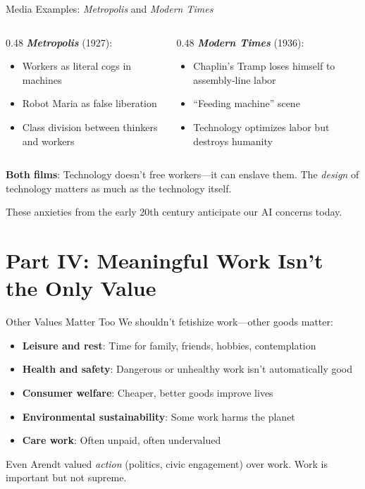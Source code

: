 ﻿\documentclass[aspectratio=169,11pt]{beamer}
\begin{document}
\begin{frame}{Media Examples: \emph{Metropolis} and \emph{Modern Times}}
\begin{columns}[T]
\begin{column}{0.48\textwidth}
\textbf{\emph{Metropolis}} (1927):
\begin{itemize}
    \item Workers as literal cogs in machines
    \item Robot Maria as false liberation
    \item Class division between thinkers and workers
\end{itemize}
\end{column}
\begin{column}{0.48\textwidth}
\textbf{\emph{Modern Times}} (1936):
\begin{itemize}
    \item Chaplin's Tramp loses himself to assembly-line labor
    \item ``Feeding machine'' scene
    \item Technology optimizes labor but destroys humanity
\end{itemize}
\end{column}
\end{columns}

\vspace{0.3em}
\textbf{Both films}: Technology doesn't free workers---it can enslave them. The \emph{design} of technology matters as much as the technology itself.

\vspace{0.2em}
These anxieties from the early 20th century anticipate our AI concerns today.
\end{frame}

\section{Part IV: Meaningful Work Isn't the Only Value}

\begin{frame}{Other Values Matter Too}
We shouldn't fetishize work---other goods matter:
\begin{itemize}
    \item \textbf{Leisure and rest}: Time for family, friends, hobbies, contemplation
    \item \textbf{Health and safety}: Dangerous or unhealthy work isn't automatically good
    \item \textbf{Consumer welfare}: Cheaper, better goods improve lives
    \item \textbf{Environmental sustainability}: Some work harms the planet
    \item \textbf{Care work}: Often unpaid, often undervalued
\end{itemize}

\vspace{0.2em}
Even Arendt valued \emph{action} (politics, civic engagement) over work. Work is important but not supreme.
\end{frame}
\end{document}
